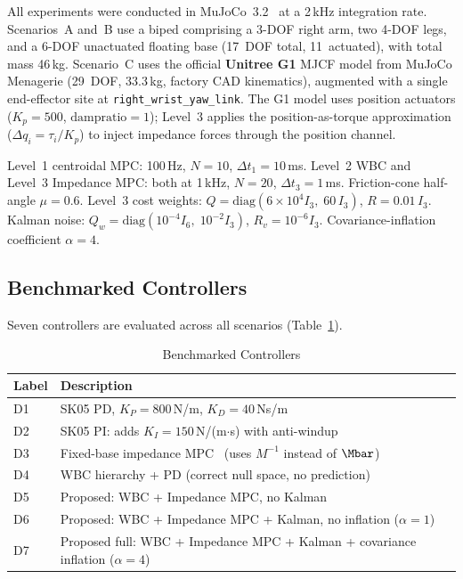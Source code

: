 All experiments were conducted in MuJoCo~3.2~\cite{todorov2012mujoco} at a
2\,kHz integration rate.
Scenarios~A and~B use a biped comprising a 3-DOF right arm, two 4-DOF legs,
and a 6-DOF unactuated floating base (17~DOF total, 11~actuated), with
total mass 46\,kg.
Scenario~C uses the official \textbf{Unitree G1} MJCF model from MuJoCo
Menagerie (29~DOF, 33.3\,kg, factory CAD kinematics), augmented with a
single end-effector site at \texttt{right\_wrist\_yaw\_link}.
The G1 model uses position actuators ($K_p=500$, $\text{dampratio}=1$);
Level~3 applies the position-as-torque approximation
($\Delta q_i=\tau_i/K_p$) to inject impedance forces through the position
channel.

Level~1 centroidal MPC: 100\,Hz, $N=10$, $\Delta t_1=10$\,ms.
Level~2 WBC and Level~3 Impedance MPC: both at 1\,kHz, $N=20$,
$\Delta t_3=1$\,ms.
Friction-cone half-angle $\mu=0.6$.
Level~3 cost weights: $Q=\mathrm{diag}(6\times10^4 I_3,\;60\,I_3)$,
$R=0.01\,I_3$.
Kalman noise: $Q_w=\mathrm{diag}(10^{-4}I_6,\;10^{-2}I_3)$,
$R_v=10^{-6}I_3$.
Covariance-inflation coefficient $\alpha=4$.

\subsection{Benchmarked Controllers}

Seven controllers are evaluated across all scenarios (Table~\ref{tab:controllers}).

\begin{table}[!t]
\caption{Benchmarked Controllers}
\label{tab:controllers}
\renewcommand{\arraystretch}{1.2}
\begin{tabular}{lp{6cm}}
\toprule
\textbf{Label} & \textbf{Description} \\
\midrule
D1 & SK05 PD, $K_P=800$\,N/m, $K_D=40$\,Ns/m \\
D2 & SK05 PI: adds $K_I=150$\,N/(m$\cdot$s) with anti-windup \\
D3 & Fixed-base impedance MPC~\cite{cao2026impedance} (uses $M^{-1}$ instead of $\Mbar$) \\
D4 & WBC hierarchy + PD (correct null space, no prediction) \\
D5 & Proposed: WBC + Impedance MPC, no Kalman \\
D6 & Proposed: WBC + Impedance MPC + Kalman, no inflation ($\alpha=1$) \\
D7 & Proposed full: WBC + Impedance MPC + Kalman + covariance inflation ($\alpha=4$) \\
\bottomrule
\end{tabular}
\end{table}

